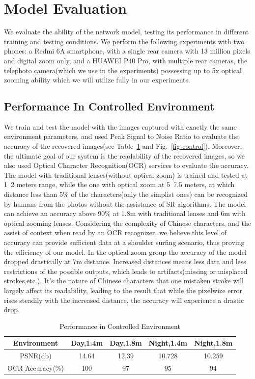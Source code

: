  
\section{Model Evaluation}
We evaluate the ability of the network model, testing its performance in different training and testing conditions. We perform the following experiments with two phones: a Redmi 6A smartphone, with a single rear camera with 13 million pixels and digital zoom only, and a HUAWEI P40 Pro, with multiple rear cameras, the telephoto camera(which we use in the experiments) possessing up to 5x optical zooming ability which we will utilize fully in our experiments. 
\subsection{Performance In Controlled Environment}
We train and test the model with the images captured with exactly the same environment parameters, and used Peak Signal to Noise Ratio to evaluate the accuracy of the recovered images(see Table~\ref{table-control} and Fig.~\ref{fig-control}). Moreover, the ultimate goal of our system is the readability of the recovered images, so we also used Optical Character Recognition(OCR) services to evaluate the accuracy. The model with traditional lenses(without optical zoom) is trained and tested at 1~2 meters range, while the one with optical zoom at 5~7.5 meters, at which distance less than 5\% of the characters(only the simplist ones) can be recognized by humans from the photos without the assistance of SR algorithms. The model can achieve an accuracy above 90\% at 1.8m with traditional lenses and 6m with optical zooming lenses. Considering the complexity of Chinese characters, and the assist of context when read by an OCR recognizer, we believe this level of accuracy can provide sufficient data at a shoulder surfing scenario, thus proving the efficiency of our model.
In the optical zoom group the accuracy of the model dropped drastically at 7m distance. Increased distances means less data and less restrictions of the possible outputs, which leads to artifacts(missing or misplaced strokes,etc.). It's the nature of Chinese characters that one mistaken stroke will largely affect its readability, leading to the result that while the pixelwize error rises steadily with the increased distance, the accuracy will experience a drastic drop.

\begin{table}  
\begin{tabular}{c|c|c|c|c} 
Environment & Day,1.4m & Day,1.8m & Night,1.4m & Night,1.8m \\ \hline
PSNR(db) & 14.64 & 12.39 & 10.728 & 10.259 \\ \hline
OCR Accuracy(\%) & 100 & 97 & 95 & 94 \\
\end{tabular} 
\caption{Performance in Controlled Environment}
\label{table-control}
\end{table}

